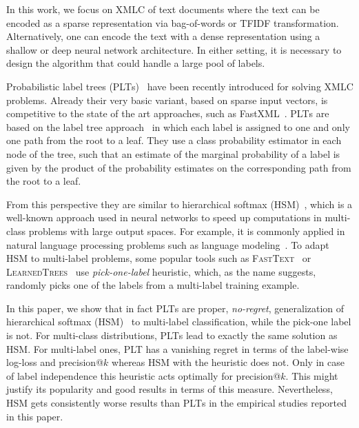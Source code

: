 \documentclass{article}
\newcommand{\Algo}[1]{\textsc{#1}}
\begin{document}
In this work, we focus on XMLC of text documents where the text can be
encoded as a sparse representation via bag-of-words or TFIDF
transformation. Alternatively, one can encode the text with a dense
representation using a shallow or deep neural network architecture.
In either setting, it is necessary to design the algorithm that could
handle a large pool of labels.
%


Probabilistic label trees (\Algo{PLT}s)~\citep{Jasinska_et_al_2016}
have been recently introduced for solving XMLC problems. Already their
very basic variant, based on sparse input vectors, is competitive to
the state of the art approaches, such as FastXML~\citep{Prabhu_Varma_2014}. 
\Algo{PLT}s are based on the label tree
approach~\cite{Beygelzimer_et_al_2009a,Bengio_et_al_2010,Deng_et_al_2011}
in which each label is assigned to one and only one path from the root
to a leaf. 
They use a class probability estimator in each node of the tree, 
such that an estimate of the marginal probability of a label is given by 
the product of the probability estimates on the corresponding path 
from the root to a leaf. 

From this perspective they are similar to hierarchical softmax (\Algo{HSM})~\citep{Morin_Bengio_2005},
which is a well-known approach used in
neural networks to speed up computations in multi-class problems with
large output spaces. For example, it is commonly applied in natural
language processing problems such as language
modeling~\citep{Mikolov_et_al_2013}. To adapt \Algo{HSM} to multi-label problems, 
some popular tools such as \Algo{FastText}~\citep{Joulin_et_al_2016} or
\Algo{LearnedTrees}~\citep{Jernite_et_al_2017} use \emph{pick-one-label} heuristic, 
which, as the name suggests, randomly picks one of the labels from a multi-label training example. 


In this paper, we show that in fact \Algo{PLT}s are proper, \emph{no-regret}, 
generalization of hierarchical softmax (\Algo{HSM})~\citep{Morin_Bengio_2005}
to multi-label classification, while the pick-one label is not. 
For multi-class distributions, \Algo{PLT}s lead to exactly the
same solution as \Algo{HSM}. 
For multi-label ones, \Algo{PLT} has a vanishing
regret in terms of the label-wise log-loss and precision@$k$ whereas \Algo{HSM} with the heuristic does not.
Only in case of label independence this heuristic acts
optimally for precision@$k$. This might justify its popularity and
good results in terms of this measure. Nevertheless, \Algo{HSM} gets
consistently worse results than \Algo{PLT}s in the empirical studies
reported in this paper.
\end{document}
